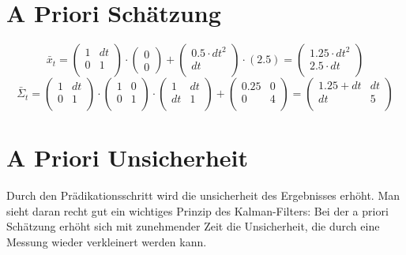 \documentclass[12pt,a4paper]{article}
\begin{document}
\section{A Priori Schätzung}
\[\bar{x}_t = \begin{pmatrix}
1 & dt \\
0 & 1 \\
\end{pmatrix} \cdot \begin{pmatrix}
0 \\ 0 \end{pmatrix} + \begin{pmatrix}
0.5 \cdot dt^2 \\ dt \\ \end{pmatrix} \cdot (2.5) =
\begin{pmatrix}
1.25 \cdot dt^2 \\
2.5 \cdot dt \\
\end{pmatrix}
\]
\[
\bar{\Sigma}_t = \begin{pmatrix}
1 & dt \\
0 & 1 \\
\end{pmatrix} \cdot \begin{pmatrix}
1 & 0 \\
0 & 1 \\
\end{pmatrix} \cdot \begin{pmatrix}
1 & dt \\
dt & 1 \\
\end{pmatrix} + \begin{pmatrix}
0.25 & 0 \\
0 & 4 \\
\end{pmatrix}  =
\begin{pmatrix}
1.25 + dt & dt \\
dt & 5 \\
\end{pmatrix}
\]

\section{A Priori Unsicherheit}
Durch den Prädikationsschritt wird die unsicherheit des Ergebnisses erhöht. Man sieht daran recht gut ein wichtiges Prinzip des Kalman-Filters: Bei der a priori Schätzung erhöht sich mit zunehmender Zeit die Unsicherheit, die durch eine Messung wieder verkleinert werden kann.
\end{document}
